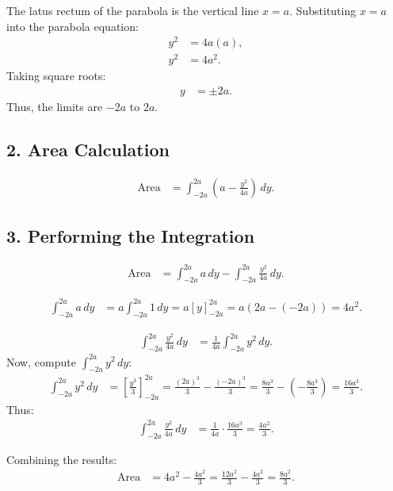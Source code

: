 \documentclass[article]{IEEEtran}
\numberwithin{figure}{enumi}
\begin{document}
The latus rectum of the parabola is the vertical line $x = a$. Substituting $x = a$ into the parabola equation:
\begin{align}
y^2 &= 4a(a), \\
y^2 &= 4a^2.
\end{align}
Taking square roots:
\begin{align}
y &= \pm 2a.
\end{align}
Thus, the limits are $-2a$ to $2a$.

\subsection*{2. Area Calculation}

\begin{align}
\text{Area} &= \int_{-2a}^{2a} \left(a - \frac{y^2}{4a}\right) \, dy.
\end{align}

\subsection*{3. Performing the Integration}

\begin{align}
\text{Area} &= \int_{-2a}^{2a} a \, dy - \int_{-2a}^{2a} \frac{y^2}{4a} \, dy.
\end{align}


\begin{align}
\int_{-2a}^{2a} a \, dy &= a \int_{-2a}^{2a} 1 \, dy = a [y]_{-2a}^{2a} = a(2a - (-2a)) = 4a^2.
\end{align}


\begin{align}
\int_{-2a}^{2a} \frac{y^2}{4a} \, dy &= \frac{1}{4a} \int_{-2a}^{2a} y^2 \, dy.
\end{align}
Now, compute $\int_{-2a}^{2a} y^2 \, dy$:
\begin{align}
\int_{-2a}^{2a} y^2 \, dy &= \left[\frac{y^3}{3}\right]_{-2a}^{2a} = \frac{(2a)^3}{3} - \frac{(-2a)^3}{3} = \frac{8a^3}{3} - \left(-\frac{8a^3}{3}\right) = \frac{16a^3}{3}.
\end{align}
Thus:
\begin{align}
\int_{-2a}^{2a} \frac{y^2}{4a} \, dy &= \frac{1}{4a} \cdot \frac{16a^3}{3} = \frac{4a^2}{3}.
\end{align}

Combining the results:\\
\begin{align}
\text{Area} &= 4a^2 - \frac{4a^2}{3} = \frac{12a^2}{3} - \frac{4a^2}{3} = \frac{8a^2}{3}.
\end{align}
\end{document}
